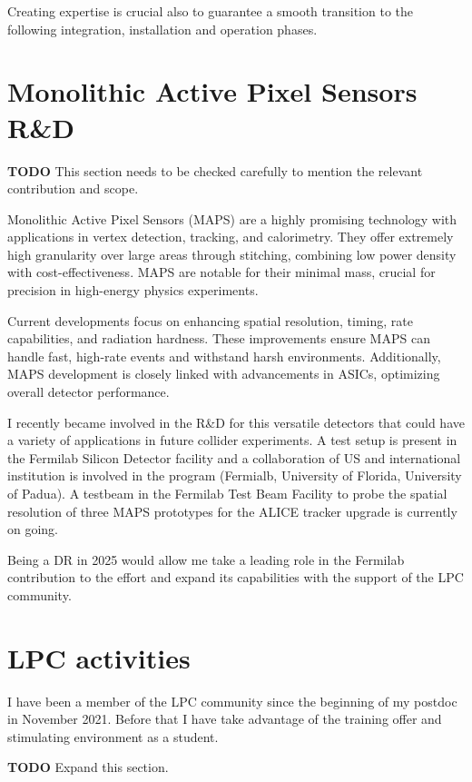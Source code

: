 {\begin{flushleft}
Creating expertise is crucial also to guarantee a smooth transition to the following integration, installation and operation phases. 
\vspace{\baselineskip}
\section{Monolithic Active Pixel Sensors R\&D}
{\bf TODO} This section needs to be checked carefully to mention the relevant contribution and scope.


Monolithic Active Pixel Sensors (MAPS) are a highly promising technology with applications in vertex detection, tracking, and calorimetry. They offer extremely high granularity over large areas through stitching, combining low power density with cost-effectiveness. MAPS are notable for their minimal mass, crucial for precision in high-energy physics experiments.

Current developments focus on enhancing spatial resolution, timing, rate capabilities, and radiation hardness. These improvements ensure MAPS can handle fast, high-rate events and withstand harsh environments. Additionally, MAPS development is closely linked with advancements in ASICs, optimizing overall detector performance.

I recently became involved in the R\&D for this versatile detectors that could have a variety of applications in future collider experiments. A test setup is present in the Fermilab Silicon Detector facility and a collaboration of US and international institution is involved in the program (Fermialb, University of Florida, University of Padua). A testbeam in the Fermilab Test Beam Facility to probe the spatial resolution of three MAPS prototypes for the ALICE tracker upgrade is currently on going. 

Being a DR in 2025 would allow me take a leading role in the Fermilab contribution to the effort and expand its capabilities with the support of the LPC community.


 
\section{LPC activities}
\vspace{\baselineskip}
I have been a member of the LPC community since the beginning of my postdoc in November 2021.  Before that I have take advantage of the training offer and stimulating environment as a student.

{\bf TODO}
Expand this section.




\end{flushleft}}
